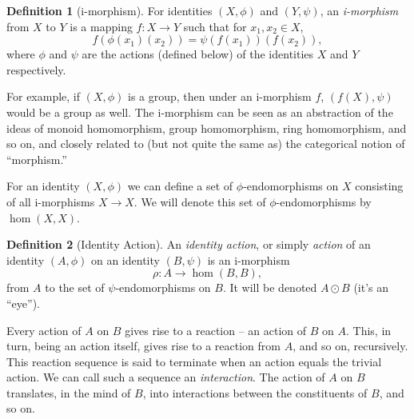 \documentclass[pra,twocolumn,groupedaddress,10pt]{revtex4}
\theoremstyle{definition}
\newtheorem{defn}{Definition}[section]
\begin{document}

\begin{defn}[i-morphism]
	For identities $(X, \phi)$ and $(Y, \psi)$, an \emph{i-morphism} from $X$ to $Y$ is a mapping $f : X \rightarrow Y$ such that for $x_1, x_2 \in X$,
	\begin{equation}
		f(\phi(x_1)(x_2)) = \psi(f(x_1))(f(x_2)) , %
		\nonumber
	\end{equation}
	where $\phi$ and $\psi$ are the actions (defined below) of the identities $X$ and $Y$ respectively.
\end{defn}

For example, if $(X, \phi)$ is a group, then under an i-morphism $f$, $(f(X), \psi)$ would be a group as well. The i-morphism can be seen as an abstraction of the ideas of monoid homomorphism, group homomorphism, ring homomorphism, and so on, and closely related to (but not quite the same as) the categorical notion of ``morphism.''

For an identity $(X, \phi)$ we can define a set of $\phi$-endomorphisms on $X$ consisting of all i-morphisms $X \rightarrow X$. We will denote this set of $\phi$-endomorphisms by $\hom(X, X)$.

\begin{defn}[Identity Action]
	An \emph{identity action}, or simply \emph{action} of an identity $(A, \phi)$ on an identity $(B, \psi)$ is an i-morphism
	\begin{equation}
		\rho : A \rightarrow \hom(B,B) ,
		\nonumber
	\end{equation}
	from $A$ to the set of $\psi$-endomorphisms on $B$. It will be denoted $A \odot B$ (it's an ``eye'').

	Every action of $A$ on $B$ gives rise to a reaction -- an action of $B$ on $A$. This, in turn, being an action itself, gives rise to a reaction from $A$, and so on, recursively. This reaction sequence is said to terminate when an action equals the trivial action. We can call such a sequence an \emph{interaction}. The action of $A$ on $B$ translates, in the mind of $B$, into interactions between the constituents of $B$, and so on.
\end{defn}
\end{document}
